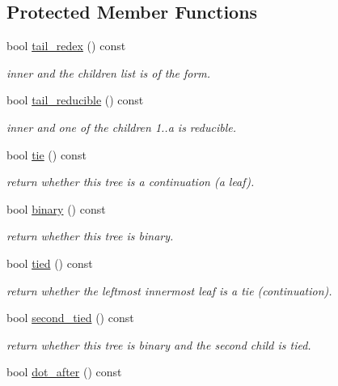 \subsection*{Protected Member Functions}
\begin{DoxyCompactItemize}
\item 
bool \mbox{\hyperlink{group__output_gaf723874e871dc01efb036ccbac07c32b}{tail\+\_\+redex}} () const
\begin{DoxyCompactList}\small\item\em inner and the children list is of the form. \end{DoxyCompactList}\item 
bool \mbox{\hyperlink{group__output_ga799761965ae00bb24e16ebb98f66995a}{tail\+\_\+reducible}} () const
\begin{DoxyCompactList}\small\item\em inner and one of the children 1..a is reducible. \end{DoxyCompactList}\item 
bool \mbox{\hyperlink{group__output_ga3933e83072d4e7c3bb3d19d25df90b47}{tie}} () const
\begin{DoxyCompactList}\small\item\em return whether this tree is a continuation (a leaf). \end{DoxyCompactList}\item 
bool \mbox{\hyperlink{group__output_gafb30d2c520e4c5e8600ae3a58abf9c72}{binary}} () const
\begin{DoxyCompactList}\small\item\em return whether this tree is binary. \end{DoxyCompactList}\item 
bool \mbox{\hyperlink{group__output_gacd73e0032e3dd22320819c4cda3d60a4}{tied}} () const
\begin{DoxyCompactList}\small\item\em return whether the leftmost innermost leaf is a tie (continuation). \end{DoxyCompactList}\item 
bool \mbox{\hyperlink{group__output_ga9aebdccd4ce1d1029d03f4ec38c101c4}{second\+\_\+tied}} () const
\begin{DoxyCompactList}\small\item\em return whether this tree is binary and the second child is tied. \end{DoxyCompactList}\item 
bool \mbox{\hyperlink{group__output_gac785e6d945ef6e0808132459669ab038}{dot\+\_\+after}} () const

\end{DoxyCompactItemize}
